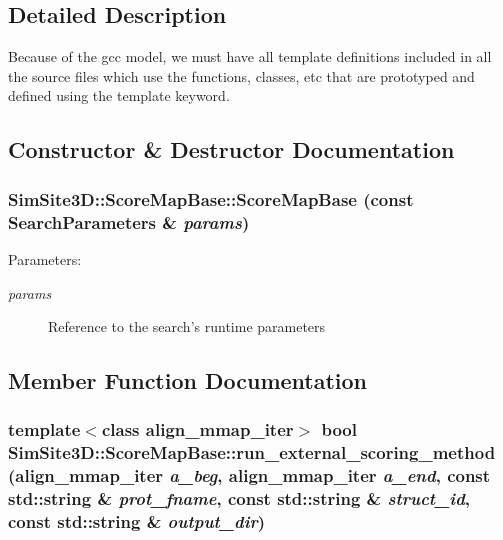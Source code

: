 \subsection{Detailed Description}
Because of the gcc model, we must have all template definitions included in all the source files which use the functions, classes, etc that are prototyped and defined using the template keyword. 



\subsection{Constructor \& Destructor Documentation}
\subsubsection{\setlength{\rightskip}{0pt plus 5cm}SimSite3D::Score\-Map\-Base::Score\-Map\-Base (const \bf{Search\-Parameters} \& {\em params})\hspace{0.3cm}{\tt  [inline]}}\label{classSimSite3D_1_1ScoreMapBase_17c627b5ef8a777466b2f9ebc50bd228}


\begin{Desc}
\item[Parameters:]
\begin{description}
\item[{\em params}]Reference to the search's runtime parameters \end{description}
\end{Desc}


\subsection{Member Function Documentation}
\subsubsection{\setlength{\rightskip}{0pt plus 5cm}template$<$class align\_\-mmap\_\-iter$>$ bool SimSite3D::Score\-Map\-Base::run\_\-external\_\-scoring\_\-method (align\_\-mmap\_\-iter {\em a\_\-beg}, align\_\-mmap\_\-iter {\em a\_\-end}, const std::string \& {\em prot\_\-fname}, const std::string \& {\em struct\_\-id}, const std::string \& {\em output\_\-dir})\hspace{0.3cm}{\tt  [inline]}}\label{classSimSite3D_1_1ScoreMapBase_85708eaffffc9a4e36bbd7375b552586}


